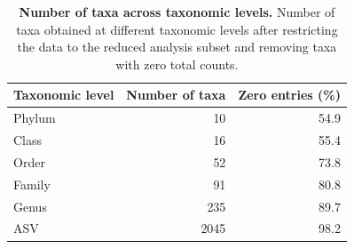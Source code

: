 \begin{table}

\caption{\label{tab:unnamed-chunk-3}\textbf{Number of taxa across taxonomic levels.} Number of taxa obtained at different taxonomic levels after restricting the data to the reduced analysis subset and removing taxa with zero total counts.}
\centering
\begin{tabular}[t]{lrr}
\toprule
Taxonomic level & Number of taxa & Zero entries (\%)\\
\midrule
Phylum & 10 & 54.9\\
Class & 16 & 55.4\\
Order & 52 & 73.8\\
Family & 91 & 80.8\\
Genus & 235 & 89.7\\
\addlinespace
ASV & 2045 & 98.2\\
\bottomrule
\end{tabular}
\end{table}

